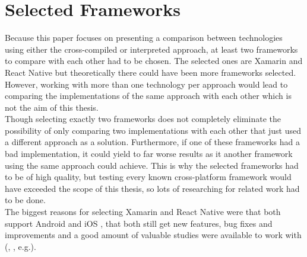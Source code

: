 \documentclass[Bachelor,BIF,english]{twbook}
\begin{document}
\chapter{Selected Frameworks}
Because this paper focuses on presenting a comparison between technologies using either the cross-compiled or interpreted approach, at least two frameworks to compare with each other had to be chosen. The selected ones are Xamarin and React Native but theoretically there could have been more frameworks selected. However, working with more than one technology per approach would lead to comparing the implementations of the same approach with each other which is not the aim of this thesis. 
\\[\baselineskip]
Though selecting exactly two frameworks does not completely eliminate the possibility of only comparing two implementations with each other that just used a different approach as a solution. Furthermore, if one of these frameworks had a bad implementation, it could yield to far worse results as it another framework using the same approach could achieve. This is why the selected frameworks had to be of high quality, but testing every known cross-platform framework would have exceeded the scope of this thesis, so lots of researching for related work had to be done. 
\\[\baselineskip]
The biggest reasons for selecting Xamarin and React Native were that both support Android and iOS \cite[p.~1]{JohanssonSderberg2018} \cite[p.~12]{ZubaBernhard2017EdPb}, that both still get new features, bug fixes and improvements \cite{XamarinRoadmap} \cite{ReactNativeRoadmap} and a good amount of valuable studies were available to work with (\cite{Danielsson_2016}, \cite{MartinezLecomte2018}, \cite{GaouarBenamarBendimerad2016} e.g.).
\end{document}
